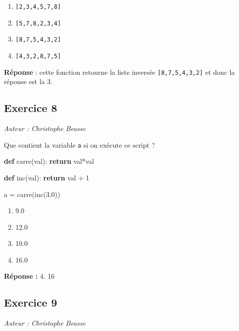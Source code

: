 \documentclass[11pt]{article}
\providecommand{\tightlist}{%
      \setlength{\itemsep}{0pt}\setlength{\parskip}{0pt}}
\newenvironment{Shaded}{}{}
\newcommand{\KeywordTok}[1]{\textcolor[rgb]{0.00,0.44,0.13}{\textbf{{#1}}}}
\newcommand{\DecValTok}[1]{\textcolor[rgb]{0.25,0.63,0.44}{{#1}}}
\newcommand{\FloatTok}[1]{\textcolor[rgb]{0.25,0.63,0.44}{{#1}}}
\newcommand{\NormalTok}[1]{{#1}}
\newcommand{\ControlFlowTok}[1]{\textcolor[rgb]{0.00,0.44,0.13}{\textbf{{#1}}}}
\newcommand{\OperatorTok}[1]{\textcolor[rgb]{0.40,0.40,0.40}{{#1}}}
\begin{document}
\begin{enumerate}
\def\labelenumi{\arabic{enumi}.}
\tightlist
\item
  \texttt{{[}2,3,4,5,7,8{]}}
\item
  \texttt{{[}5,7,8,2,3,4{]}}
\item
  \texttt{{[}8,7,5,4,3,2{]}}
\item
  \texttt{{[}4,3,2,8,7,5{]}}
\end{enumerate}

    \textbf{Réponse} : cette fonction retourne la liste inversée
\texttt{{[}8,7,5,4,3,2{]}} et donc la réponse est la 3.

    \hypertarget{exercice-8}{%
\subsection{Exercice 8}\label{exercice-8}}

\emph{Auteur : Christophe Beasse}

Que contient la variable \texttt{a} si on exécute ce script ?

\begin{Shaded}
\begin{Highlighting}[]
\KeywordTok{def}\NormalTok{ carre(val):}
  \ControlFlowTok{return}\NormalTok{ val}\OperatorTok{*}\NormalTok{val}

\KeywordTok{def}\NormalTok{ inc(val):}
  \ControlFlowTok{return}\NormalTok{ val }\OperatorTok{+} \DecValTok{1}

\NormalTok{a }\OperatorTok{=}\NormalTok{ carre(inc(}\FloatTok{3.0}\NormalTok{))}
\end{Highlighting}
\end{Shaded}

\begin{enumerate}
\def\labelenumi{\arabic{enumi}.}
\tightlist
\item
  9.0
\item
  12.0
\item
  10.0
\item
  16.0
\end{enumerate}

    \textbf{Réponse :} 4. 16

    \hypertarget{exercice-9}{%
\subsection{Exercice 9}\label{exercice-9}}

\emph{Auteur : Christophe Beasse}
\end{document}
